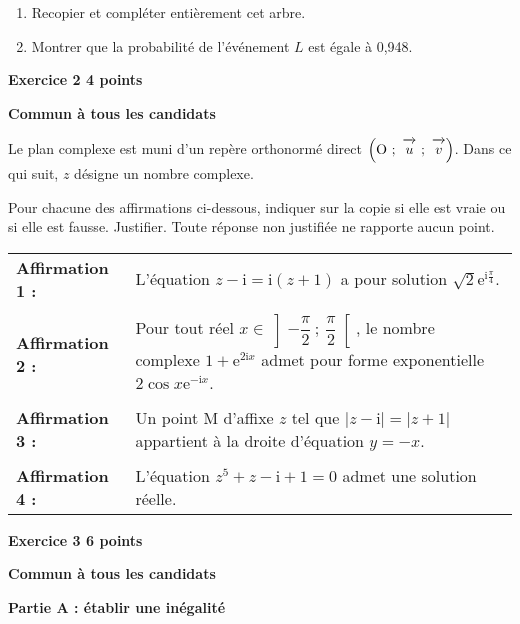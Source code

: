 \documentclass[10pt]{article}
\newcommand{\vect}[1]{\overrightarrow{\,\mathstrut#1\,}}
\def\Ouv{$\left(\text{O}~;~\vect{u}~;~\vect{v}\right)$}
\newcommand{\e}{\text{e}}
\begin{document}
\begin{enumerate}
	\item Recopier et compléter entièrement cet arbre.	
	\item Montrer que la probabilité de l'événement $L$ est égale à 0,948.
\end{enumerate}

\vspace{5mm}

\textbf{Exercice 2 \hfill 4 points} 

\textbf{Commun à tous les candidats} 

\medskip

Le plan complexe est muni d'un repère orthonormé direct \Ouv. Dans ce qui suit, $z$ désigne un nombre complexe.

\medskip

Pour chacune des affirmations ci-dessous, indiquer sur la copie si elle est vraie ou si elle est fausse. Justifier. Toute réponse non justifiée ne rapporte aucun point.

\medskip

\begin{tabularx}{\linewidth}{l X}
\textbf{Affirmation 1 :}& L'équation $z - \text{i} = \text{i}(z + 1)$ a pour solution $\sqrt{2}\e^{\text{i}\frac{\pi}{4}}$.      \\ \\
	
\textbf{Affirmation 2 :}& Pour tout réel $x \in \left] -\dfrac{\pi}{2}~;~\dfrac{\pi}{2} \right[$, le nombre complexe $1 + \e^{2\text{i} x}$ admet pour forme exponentielle $2 \cos x \e^{-\text{i}x}$.\\ \\
	
\textbf{Affirmation 3 :}& Un point M d'affixe $z$ tel que $\big|z - \text{i}\big| = \big|z + 1\big|$ appartient à la droite d'équation $y = -x$.\\ \\
	
\textbf{Affirmation 4 :}& L'équation $z^5 + z - \text{i} + 1 = 0$ admet une solution réelle.
\end{tabularx}

\vspace{5mm}

\textbf{Exercice 3 \hfill 6 points} 

\textbf{Commun à tous les candidats} 

\medskip

\textbf{Partie A : établir une inégalité}
\medskip
\end{document}
